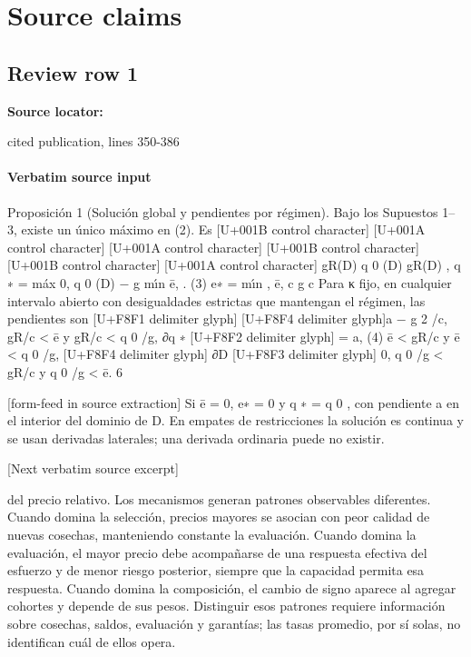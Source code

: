 \documentclass[10pt]{article}
\begin{document}
\clearpage
\hypertarget{source-claim-71d1c57a6546a5a7}{}
\hypertarget{source-section-f10b5f68e4acf3dc}{}
\section*{Source claims}
\subsection*{Review row 1}
\textbf{Source locator:} {\footnotesize\raggedright cited publication, lines 350-\allowbreak{}386\par}
\paragraph{Verbatim source input}
\begin{ReviewVerbatim}
Proposición 1 (Solución global y pendientes por régimen). Bajo los Supuestos 1–3, existe un
único máximo en (2). Es
[U+001B control character]
[U+001A control character]
[U+001A control character]
[U+001B control character][U+001B control character]
[U+001A control character]
gR(D)
q 0 (D)
gR(D)
,
q ∗ = máx 0, q 0 (D) − g mı́n ē,
.
(3)
e∗ = mı́n
, ē,
c
g
c
Para κ ﬁjo, en cualquier intervalo abierto con desigualdades estrictas que mantengan el régimen,
las pendientes son
[U+F8F1 delimiter glyph]
[U+F8F4 delimiter glyph]a − g 2 /c, gR/c < ē y gR/c < q 0 /g,
∂q ∗ [U+F8F2 delimiter glyph]
= a,
(4)
ē < gR/c y ē < q 0 /g,
[U+F8F4 delimiter glyph]
∂D
[U+F8F3 delimiter glyph]
0,
q 0 /g < gR/c y q 0 /g < ē.
6


[form-feed in source extraction]
Si ē = 0, e∗ = 0 y q ∗ = q 0 , con pendiente a en el interior del dominio de D. En empates de
restricciones la solución es continua y se usan derivadas laterales; una derivada ordinaria puede
no existir.

[Next verbatim source excerpt]

del precio relativo.
Los mecanismos generan patrones observables diferentes. Cuando domina la selección, precios
mayores se asocian con peor calidad de nuevas cosechas, manteniendo constante la evaluación.
Cuando domina la evaluación, el mayor precio debe acompañarse de una respuesta efectiva del
esfuerzo y de menor riesgo posterior, siempre que la capacidad permita esa respuesta. Cuando
domina la composición, el cambio de signo aparece al agregar cohortes y depende de sus pesos.
Distinguir esos patrones requiere información sobre cosechas, saldos, evaluación y garantías; las
tasas promedio, por sí solas, no identiﬁcan cuál de ellos opera.


\end{ReviewVerbatim}
\end{document}
